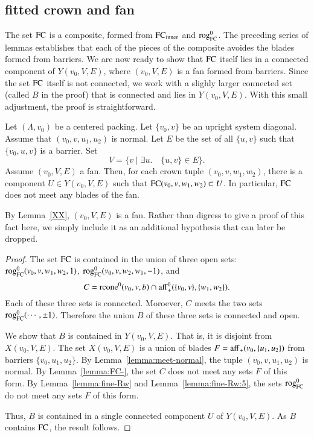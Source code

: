 \subsection{fitted crown and fan}

The set ${\operatorname{FC}}$ is a composite, formed from ${\operatorname{FC}}_{\text{inner}}$ and ${\operatorname{rog}}^0_{\text{FC}}$.  The
preceding series of lemmas establishes that each of the pieces of the composite
avoides the blades formed from barriers.  We are now ready to show that ${\operatorname{FC}}$
itself lies in a connected component of $Y(v_0,V,E)$, where $(v_0,V,E)$ is a
fan formed from barriers.  Since the set ${\operatorname{FC}}$ itself is not connected, we
work with a slighly larger connected set (called $B$ in the proof) that is connected
and lies in $Y(v_0,V,E)$.  With this small adjustment, the proof is
straightforward.


\begin{lemma}
Let $(\Lambda,v_0)$ be a centered packing.
Let $\{v_0,v\}$ be
an upright system diagonal.
Assume that $(v_0,v,u_1,u_2)$ is normal.
Let $E$ be the set of all $\{u,v\}$ such that $\{v_0,u,v\}$
is a barrier.  Set
   $$
   V = \{v \mid \exists u.\quad \{u,v\}\in E\}.
   $$
Assume $(v_0,V,E)$ a fan.  Then, for each crown tuple
$(v_0,v,w_1,w_2)$, there is a component $U\in Y(v_0,V,E)$ such
that ${\operatorname{FC}}(v_0,v,w_1,w_2)\subset U$.  In particular, ${\operatorname{FC}}$ does
not meet any blades of the fan.
\end{lemma}

By Lemma~\ref{XX},  $(v_0,V,E)$ is a fan.  
Rather than digress to give
a proof of this fact here, we simply include it as an additional hypothesis that
can later be dropped.

\begin{proof}
The set ${\operatorname{FC}}$ is contained in the union of three open sets:
${\operatorname{rog}}^0_{\text{FC}}(v_0,v,w_1,w_2,1)$, ${\operatorname{rog}}^0_{\text{FC}}(v_0,v,w_2,w_1,-1)$, and
  $$
  C={\operatorname{rcone}}^0(v_0,v,b)\cap {\operatorname{aff}}_+^0(\{v_0,v\},\{w_1,w_2\}).
  $$
Each of these three sets is connected.  Moroever, $C$ meets
the two sets  ${\operatorname{rog}}^0_{\text{FC}}(\cdots,\pm1)$.  Therefore the union $B$ of
these three sets is connected and open.  

We show that $B$ is contained in $Y(v_0,V,E)$.  That is,
it is disjoint from $X(v_0,V,E)$.
The set $X(v_0,V,E)$ is a union of blades $F={\operatorname{aff}}_+(v_0,\{u_1,u_2\})$
from barriers $\{v_0,u_1,u_2\}$.  By Lemma~\ref{lemma:meet-normal},
the tuple $(v_0,v,u_1,u_2)$ is normal.
By Lemma~\ref{lemma:FC-}, the set $C$ does not meet any sets $F$
of this form.  By Lemma~\ref{lemma:fine-Rw} and Lemma~\ref{lemma:fine-Rw:5}, the sets ${\operatorname{rog}}^0_{\text{FC}}$ do not meet any sets $F$ of this form.

Thus, $B$ is contained in a single connected component $U$ of $Y(v_0,V,E)$.  As $B$ contains ${\operatorname{FC}}$, the result follows.
\end{proof}


